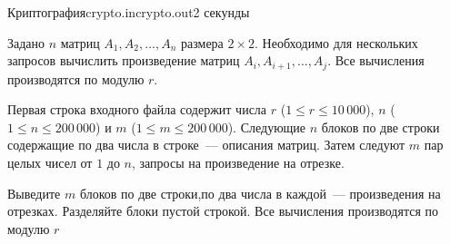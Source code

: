 \begin{problem}{Криптография}{crypto.in}{crypto.out}{2 секунды}

Задано $n$ матриц $A_1, A_2, \ldots, A_n$ размера $2\times 2$. 
Необходимо для нескольких запросов вычислить произведение матриц $A_i, A_{i+1}, \ldots, A_j$.
Все вычисления производятся по модулю $r$.

\InputFile

Первая строка входного файла содержит числа $r$ ($1 \le r \le 10\,000$),
$n$ ($1 \le n \le 200\,000$) и
$m$ ($1 \le m \le 200\,000$). 
Следующие $n$ блоков по две строки содержащие по два числа в строке~--- описания матриц.
Затем следуют $m$ пар целых чисел от $1$ до $n$, запросы на произведение на отрезке.

\OutputFile
Выведите $m$ блоков по две строки,по два числа в каждой~--- произведения на отрезках.
Разделяйте блоки пустой строкой.
Все вычисления производятся по модулю $r$

\Example

\begin{example}
%
\end{example}

\end{problem}
